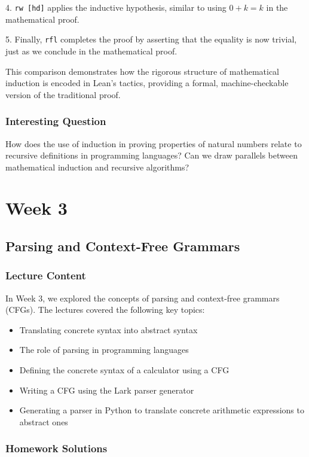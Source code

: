 \documentclass{article}
\theoremstyle{theorem}
\theoremstyle{definition}
\theoremstyle{remark}
\begin{document}
4. \texttt{rw [hd]} applies the inductive hypothesis, similar to using \(0 + k = k\) in the mathematical proof.

5. Finally, \texttt{rfl} completes the proof by asserting that the equality is now trivial, just as we conclude in the mathematical proof.

This comparison demonstrates how the rigorous structure of mathematical induction is encoded in Lean's tactics, providing a formal, machine-checkable version of the traditional proof.

\subsubsection{Interesting Question}

How does the use of induction in proving properties of natural numbers relate to recursive definitions in programming languages? Can we draw parallels between mathematical induction and recursive algorithms?

\section{Week 3}
\subsection{Parsing and Context-Free Grammars}
\subsubsection{Lecture Content}
In Week 3, we explored the concepts of parsing and context-free grammars (CFGs). The lectures covered the following key topics:
\begin{itemize}
\item Translating concrete syntax into abstract syntax
\item The role of parsing in programming languages
\item Defining the concrete syntax of a calculator using a CFG
\item Writing a CFG using the Lark parser generator
\item Generating a parser in Python to translate concrete arithmetic expressions to abstract ones
\end{itemize}
\subsubsection{Homework Solutions}
\end{document}
